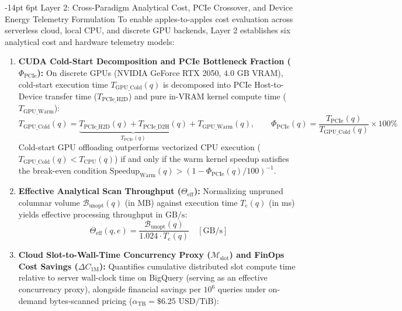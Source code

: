 \documentclass[10pt,a4paper]{article}
\makeatletter
\renewcommand\subsection{\@startsection{subsection}{2}{\z@}%
  {-14pt \@plus -3pt \@minus -1.5pt}%
  {6pt \@plus 1.5pt}%
  {\normalfont\normalsize\bfseries}}
\makeatother
\begin{document}
\subsection{Layer 2: Cross-Paradigm Analytical Cost, PCIe Crossover, and Device Energy Telemetry Formulation}
To enable apples-to-apples cost evaluation across serverless cloud, local CPU, and discrete GPU backends, Layer 2 establishes six analytical cost and hardware telemetry models:
\begin{enumerate}[leftmargin=1.5em,itemsep=3pt]
    \item \textbf{CUDA Cold-Start Decomposition and PCIe Bottleneck Fraction ($\Phi_{\text{PCIe}}$):} On discrete GPUs (NVIDIA GeForce RTX 2050, $4.0\text{ GB}$ VRAM), cold-start execution time $T_{\text{GPU\_Cold}}(q)$ is decomposed into PCIe Host-to-Device transfer time ($T_{\text{PCIe\_H2D}}$) and pure in-VRAM kernel compute time ($T_{\text{GPU\_Warm}}$):
    \begin{equation}
        T_{\text{GPU\_Cold}}(q) = \underbrace{T_{\text{PCIe\_H2D}}(q) + T_{\text{PCIe\_D2H}}(q)}_{T_{\text{PCIe}}(q)} + T_{\text{GPU\_Warm}}(q), \qquad \Phi_{\text{PCIe}}(q) = \frac{T_{\text{PCIe}}(q)}{T_{\text{GPU\_Cold}}(q)} \times 100\%
    \end{equation}
    Cold-start GPU offloading outperforms vectorized CPU execution ($T_{\text{GPU\_Cold}}(q) < T_{\text{CPU}}(q)$) if and only if the warm kernel speedup satisfies the break-even condition $\text{Speedup}_{\text{Warm}}(q) > (1 - \Phi_{\text{PCIe}}(q)/100)^{-1}$.
    \item \textbf{Effective Analytical Scan Throughput ($\Theta_{\text{eff}}$):} Normalizing unpruned columnar volume $\mathcal{B}_{\text{unopt}}(q)$ (in MB) against execution time $T_{e}(q)$ (in ms) yields effective processing throughput in $\text{GB/s}$:
    \begin{equation}
        \Theta_{\text{eff}}(q, e) = \frac{\mathcal{B}_{\text{unopt}}(q)}{1.024 \cdot T_{e}(q)} \quad [\text{GB/s}]
    \end{equation}
    \item \textbf{Cloud Slot-to-Wall-Time Concurrency Proxy ($\mathcal{M}_{\text{slot}}$) and FinOps Cost Savings ($\Delta C_{\text{1M}}$):} Quantifies cumulative distributed slot compute time relative to server wall-clock time on BigQuery (serving as an effective concurrency proxy), alongside financial savings per $10^6$ queries under on-demand bytes-scanned pricing ($\alpha_{\text{TB}} = \$6.25\text{ USD/TiB}$):
    \begin{equation}

\end{equation}
\end{enumerate}
\end{document}
